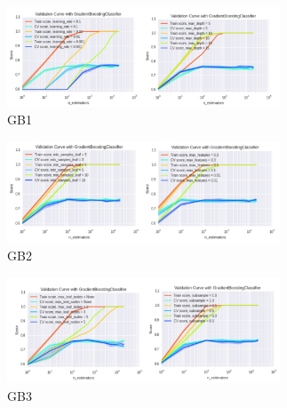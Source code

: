 \begin{figure}[h]
\centering
\includegraphics[width=3.2in]{figures/gb1}
\caption{GB1}
\label{fig:gb1}
\end{figure}
\begin{figure}[h]
\centering
\includegraphics[width=3.2in]{figures/gb2}
\caption{GB2}
\label{fig:gb2}
\end{figure}
\begin{figure}[h]
\centering
\includegraphics[width=3.2in]{figures/gb3}
\caption{GB3}
\label{fig:gb3}
\end{figure}

